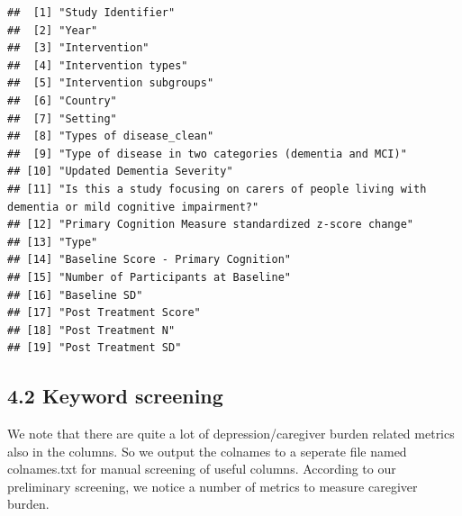 \documentclass[
]{article}
\begin{document}
\begin{verbatim}
##  [1] "Study Identifier"                                                                               
##  [2] "Year"                                                                                           
##  [3] "Intervention"                                                                                   
##  [4] "Intervention types"                                                                             
##  [5] "Intervention subgroups"                                                                         
##  [6] "Country"                                                                                        
##  [7] "Setting"                                                                                        
##  [8] "Types of disease_clean"                                                                         
##  [9] "Type of disease in two categories (dementia and MCI)"                                           
## [10] "Updated Dementia Severity"                                                                      
## [11] "Is this a study focusing on carers of people living with dementia or mild cognitive impairment?"
## [12] "Primary Cognition Measure standardized z-score change"                                          
## [13] "Type"                                                                                           
## [14] "Baseline Score - Primary Cognition"                                                             
## [15] "Number of Participants at Baseline"                                                             
## [16] "Baseline SD"                                                                                    
## [17] "Post Treatment Score"                                                                           
## [18] "Post Treatment N"                                                                               
## [19] "Post Treatment SD"
\end{verbatim}

\hypertarget{keyword-screening}{%
\subsection{4.2 Keyword screening}\label{keyword-screening}}

We note that there are quite a lot of depression/caregiver burden
related metrics also in the columns. So we output the colnames to a
seperate file named colnames.txt for manual screening of useful columns.
According to our preliminary screening, we notice a number of metrics to
measure caregiver burden.
\end{document}
